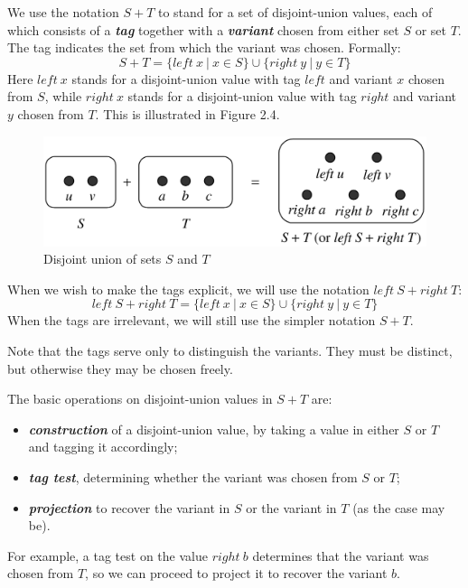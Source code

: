 \documentclass{article}
\begin{document}
We use the notation $S + T$ to stand for a set of disjoint-union values, each of which consists of a \textbf{\textit{tag}} together with a \textbf{\textit{variant}} chosen from either set $S$ or set $T$. The tag indicates the set from which the variant was chosen. Formally:
\begin{equation}
    S + T = \{left\ x\ |\ x \in S\} \cup \{right\ y\ |\ y \in T\}
\end{equation}
Here $left\ x$ stands for a disjoint-union value with tag $left$ and variant $x$ chosen from $S$, while $right\ x$ stands for a disjoint-union value with tag $right$ and variant $y$ chosen from $T$. This is illustrated in Figure 2.4.
\begin{figure}[h!]
    \centering
    \includegraphics[width=.5\textwidth]{img/Fig2.4.png}
    \caption{Disjoint union of sets $S$ and $T$}
    \label{fig:my_label}
\end{figure}

When we wish to make the tags explicit, we will use the notation $left\ S + right\ T$:
\begin{equation}
    left\ S + right\ T = \{left\ x\ |\ x \in S\} \cup \{right\ y\ |\ y \in T\}
\end{equation}
When the tags are irrelevant, we will still use the simpler notation $S + T$.

Note that the tags serve only to distinguish the variants. They must be distinct, but otherwise they may be chosen freely. 

The basic operations on disjoint-union values in $S + T$ are:
\begin{itemize}
    \item \textbf{\textit{construction}} of a disjoint-union value, by taking a value in either $S$ or $T$ and tagging it accordingly;
    \item \textbf{\textit{tag test}}, determining whether the variant was chosen from $S$ or $T$;
    \item \textbf{\textit{projection}} to recover the variant in $S$ or the variant in $T$ (as the case may be).
\end{itemize}
For example, a tag test on the value $right\ b$ determines that the variant was chosen from $T$, so we can proceed to project it to recover the variant $b$.
\end{document}
